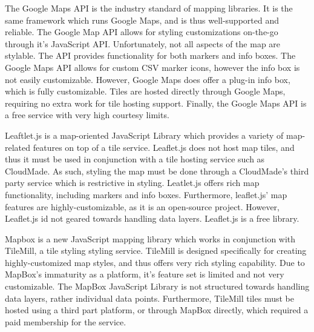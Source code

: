 \documentclass{report}
\begin{document}
The Google Maps API is the industry standard of mapping libraries. It is the same framework which runs Google Maps, and is thus well-supported and reliable. The Google Map API allows for styling customizations on-the-go through it's JavaScript API. Unfortunately, not all aspects of the map are stylable. The API provides functionality for both markers and info boxes. The Google Maps API allows for custom CSV marker icons, however the info box is not easily customizable. However, Google Maps does offer a plug-in info box, which is fully customizable. Tiles are hosted directly through Google Maps, requiring no extra work for tile hosting support. Finally, the Google Maps API is a free service with very high courtesy limits.

Leaftlet.js is a map-oriented JavaScript Library which provides a variety of map-related features on top of a tile service. Leaflet.js does not host map tiles, and thus it must be used in conjunction with a tile hosting service such as CloudMade. As such, styling the map must be done through a CloudMade's third party service which is restrictive in styling. Leatlet.js offers rich map functionality, including markers and info boxes. Furthermore, leaflet.js' map features are highly-customizable, as it is an open-source project. However, Leaflet.js id not geared towards handling data layers. Leaflet.js is a free library.

Mapbox is a new JavaScript mapping library which works in conjunction with TileMill, a tile styling styling service. TileMill is designed specifically for creating highly-customized map styles, and thus offers very rich styling capability. Due to MapBox's immaturity as a platform, it's feature set is limited and not very customizable. The MapBox JavaScript Library is not structured towards handling data layers, rather individual data points. Furthermore, TileMill tiles must be hosted using a third part platform, or through MapBox directly, which required a paid membership for the service.
\end{document}
